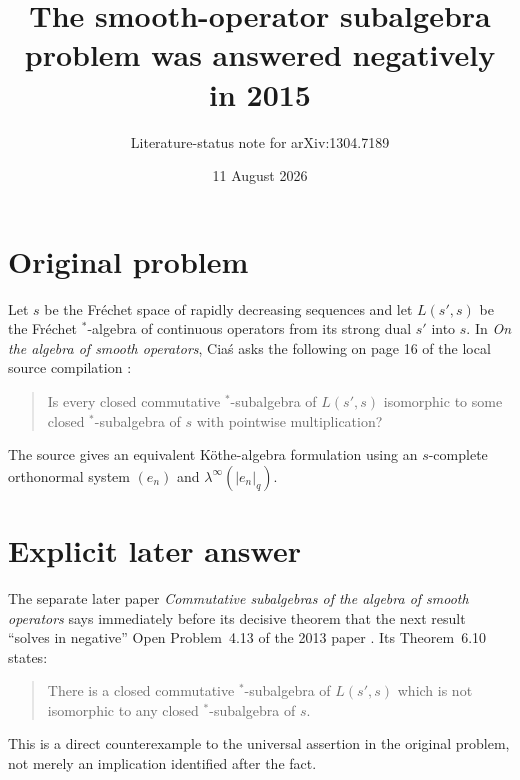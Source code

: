 \documentclass[11pt]{article}
\title{The smooth-operator subalgebra problem was answered negatively in 2015}
\author{Literature-status note for arXiv:1304.7189}
\date{11 August 2026}
\begin{document}
\maketitle

\begin{center}
\end{center}

\section*{Original problem}

Let $s$ be the Fr\'echet space of rapidly decreasing sequences and let
$L(s',s)$ be the Fr\'echet $^*$-algebra of continuous operators from its strong
dual $s'$ into $s$.  In \emph{On the algebra of smooth operators}, Cia\'s asks
the following on page 16 of the local source compilation
\cite[Open Problem~4.13]{source}:
\begin{quote}
Is every closed commutative $^*$-subalgebra of $L(s',s)$ isomorphic to some
closed $^*$-subalgebra of $s$ with pointwise multiplication?
\end{quote}
The source gives an equivalent K\"othe-algebra formulation using an
$s$-complete orthonormal system $(e_n)$ and
$\lambda^\infty(|e_n|_q)$.

\section*{Explicit later answer}

The separate later paper \emph{Commutative subalgebras of the algebra of
smooth operators} says immediately before its decisive theorem that the next
result ``solves in negative'' Open Problem~4.13 of the 2013 paper
\cite[p.~14]{answer}.  Its Theorem~6.10 states:
\begin{quote}
There is a closed commutative $^*$-subalgebra of $L(s',s)$ which is not
isomorphic to any closed $^*$-subalgebra of $s$.
\end{quote}
This is a direct counterexample to the universal assertion in the original
problem, not merely an implication identified after the fact.
\end{document}
